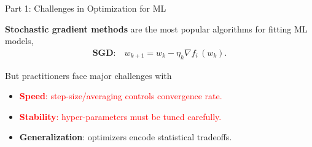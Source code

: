 \documentclass[mathserif,notheorems, hyperref={colorlinks, citecolor=blue, urlcolor=blue, linkcolor=blue}]{beamer}
\def\\{}%
\begin{document}
    \begin{frame}{Part 1: Challenges in Optimization for ML}

        \textbf{Stochastic gradient methods} are the most popular algorithms for fitting ML models,
        \begin{align*}
            \textbf{SGD:} \quad w_{k + 1} = w_k - \eta_k \nabla f_i \, (w_k). \\
        \end{align*}


        But practitioners face major challenges with \vspace{0.5em}
        \begin{itemize}
            \item \textcolor{red}{\textbf{Speed}: step-size/averaging controls convergence rate.}
            \item \textcolor{red}{\textbf{Stability}: hyper-parameters must be tuned carefully.}
            \item \textbf{Generalization}: optimizers encode statistical tradeoffs.
        \end{itemize}
        \vspace{1em}

    \end{frame}
\end{document}
